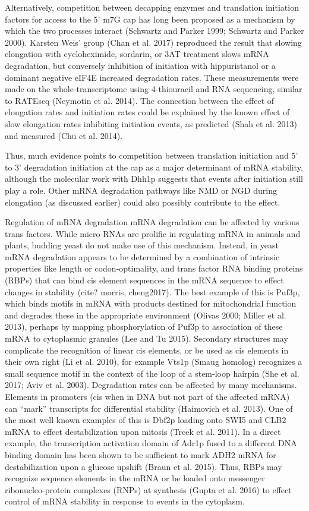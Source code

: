 Alternatively, competition between
decapping enzymes and translation initiation factors for access to the
5’ m7G cap has long been proposed as a mechanism by which the two
processes interact (Schwartz and Parker 1999; Schwartz and Parker
2000). Karsten Weis’ group (Chan et al. 2017) reproduced the result
that slowing elongation with cycloheximide, sordarin, or 3AT treatment
slows mRNA degradation, but conversely inhibition of initiation with
hippuristanol or a dominant negative eIF4E increased degradation
rates. These measurements were made on the whole-transcriptome using
4-thiouracil and RNA sequencing, similar to RATEseq (Neymotin et al.
2014). The connection between the effect of elongation rates and
initiation rates could be explained by the known effect of slow
elongation rates inhibiting initiation events, as predicted (Shah et
al. 2013) and measured (Chu et al. 2014).  

Thus, much evidence points
to competition between translation initiation and 5’ to 3’ degradation
initiation at the cap as a major determinant of mRNA stability,
although the molecular work with Dhh1p suggests that events after
initiation still play a role. Other mRNA degradation pathways like NMD
or NGD during elongation (as discussed earlier) could also possibly
contribute to the effect.  

Regulation of mRNA degradation mRNA
degradation can be affected by various trans factors. While micro RNAs
are prolific in regulating mRNA in animals and plants, budding yeast
do not make use of this mechanism. Instead, in yeast mRNA degradation
appears to be determined by a combination of intrinsic properties like
length or codon-optimality, and trans factor RNA binding proteins
(RBPs) that can bind cis element sequences in the mRNA sequence to
effect changes in stability (cite? morris, cheng2017). The best
example of this is Puf3p, which binds motifs in mRNA with products
destined for mitochondrial function and degrades these in the
appropriate environment (Olivas 2000; Miller et al. 2013), perhaps by
mapping phosphorylation of Puf3p to association of these mRNA to
cytoplasmic granules (Lee and Tu 2015). Secondary structures may
complicate the recognition of linear cis elements, or be used as cis
elements in their own right (Li et al. 2010), for example Vts1p (Smaug
homolog) recognizes a small sequence motif in the context of the loop
of a stem-loop hairpin (She et al. 2017; Aviv et al. 2003).
Degradation rates can be affected by many mechanisms. Elements in
promoters (cis when in DNA but not part of the affected mRNA) can
“mark” transcripts for differential stability (Haimovich et al. 2013).
One of the most well known examples of this is Dbf2p loading onto SWI5
and CLB2 mRNA to effect destabilization upon mitosis (Trcek et al.
2011). In a direct example, the transcription activation domain of
Adr1p fused to a different DNA binding domain has been shown to be
sufficient to mark ADH2 mRNA for destabilization upon a glucose
upshift (Braun et al. 2015). Thus, RBPs may recognize sequence
elements in the mRNA or be loaded onto messenger ribonucleo-protein
complexes (RNPs) at synthesis (Gupta et al. 2016) to effect control of
mRNA stability in response to events in the cytoplasm.  

